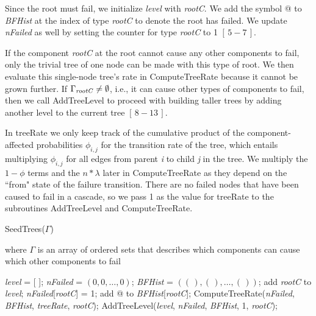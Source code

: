 \documentclass[12pt]{article}
\newcommand{\varName}[1]{\textrm{\it#1}}
\newcommand{\citeBlock}[2]{$[\,#1 - #2\,]$}
\begin{document}
Since the root must fail, we initialize \textit{level} with \textit{rootC}. We add the symbol @ to \textit{BFHist} at the index of type \textit{rootC} to denote the root has failed. We update \textit{nFailed} as well by setting the counter for type \varName{rootC} to 1 \citeBlock{5}{7}.

If the component \textit{rootC} at the root cannot cause any other components to fail, only the trivial tree of one node can be made with this type of root. We then evaluate this single-node tree's rate in ComputeTreeRate because it cannot be grown further. If $\Gamma_{\textrm{\textit{rootC}}} \neq \emptyset$, i.e., it can cause other types of components to fail, then we call AddTreeLevel to proceed with building taller trees by adding another level to the current tree \citeBlock{8}{13}.

In treeRate we only keep track of the cumulative product of the component-affected probabilities $\phi_{i,j}$ for the transition rate of the tree, which entails multiplying $\phi_{i, j}$ for all edges from parent \varName{i} to child \varName{j} in the tree. We multiply the $1-\phi$ terms and the $n * \lambda$ later in ComputeTreeRate as they depend on the ``from" state of the failure transition. There are no failed nodes that have been caused to fail in a cascade, so we pass 1 as the value for treeRate to the subroutines AddTreeLevel and ComputeTreeRate.

\begin{algorithm}
\caption{SeedTrees($\Gamma$)}
\label{alg:Seedtrees}
where $\Gamma$ is an array of ordered sets that describes which components can cause which other components to fail \\
\begin{algorithmic}[1]
\FOR{\varName{rootC} $\in$ \varName{compSet}}
  \STATE \varName{level} = [ ]; 
  \STATE \varName{nFailed} = $(0, 0, \ldots, 0)$; 
  \STATE \varName{BFHist} = $ ((\,), (\,), \ldots, (\,)) $; 
  \STATE add \varName{rootC} to \varName{level};
  \STATE \varName{nFailed}[\varName{rootC}] = 1;
  \STATE add @ to \varName{BFHist}[\varName{rootC}]; 
  \IF{Empty($\Gamma_{\varName{rootC}}$)}
    \STATE ComputeTreeRate(\varName{nFailed}, \varName{BFHist}, \varName{treeRate}, \varName{rootC});
  \ELSE
    \STATE AddTreeLevel(\varName{level}, \varName{nFailed}, \varName{BFHist}, 1, \varName{rootC});
  \ENDIF
\ENDFOR
\end{algorithmic}
\end{algorithm}
\end{document}
